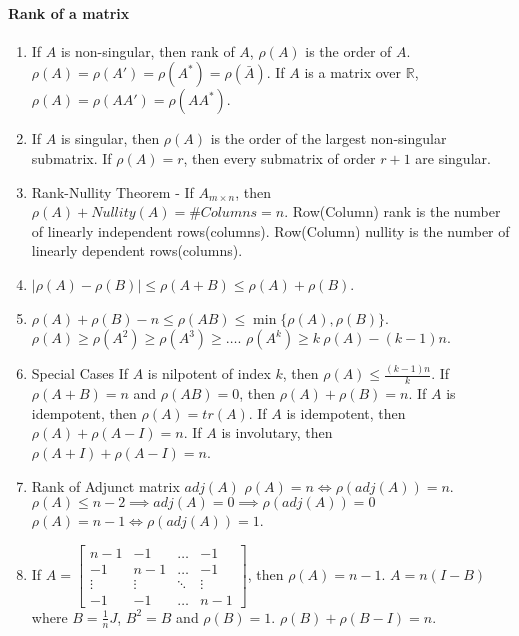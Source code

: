 \paragraph{Rank of a matrix}
\begin{enumerate}
	\item If $A$ is non-singular, then rank of $A$, $\rho(A)$ is the order of $A$.
		\subitem $\rho(A) = \rho(A') = \rho(A^\ast) = \rho(\bar{A})$.
		\subitem If $A$ is a matrix over $\mathbb{R}$, $\rho(A) = \rho(AA') = \rho(AA^\ast)$.
	\item If $A$ is singular, then $\rho(A)$ is the order of the largest non-singular submatrix.
		\subitem If $\rho(A) = r$, then every submatrix of order $r+1$ are singular.
	\item Rank-Nullity Theorem - If $A_{m \times n}$, then $\rho(A) + Nullity(A) = \# Columns = n$.
		\subitem Row(Column) rank is the number of linearly independent rows(columns).
		\subitem Row(Column) nullity is the number of linearly dependent rows(columns).
	\item $|\rho(A)-\rho(B)| \le \rho(A+B) \le \rho(A)+\rho(B)$.
	\item $\rho(A)+\rho(B)-n \le \rho(AB) \le \min\{ \rho(A),\rho(B) \}$.
		\subitem $\rho(A) \ge \rho(A^2) \ge \rho(A^3) \ge \dots$.
		\subitem $\rho(A^k) \ge k\ \rho(A) - (k-1)n$.
	\item Special Cases
		\subitem If $A$ is nilpotent of index $k$, then $\rho(A) \le \frac{(k-1)n}{k}$.
		\subitem If $\rho(A+B) = n$ and $\rho(AB) = 0$, then $\rho(A) + \rho(B) = n$.
		\subitem If $A$ is idempotent, then $\rho(A) = tr(A)$.
		\subitem If $A$ is idempotent, then $\rho(A) + \rho(A-I) = n$.
		\subitem If $A$ is involutary, then $\rho(A+I)+\rho(A-I) = n$.
	\item Rank of Adjunct matrix $adj(A)$
		\subitem $\rho(A) = n \iff \rho(adj(A)) = n$.
		\subitem $\rho(A) \le n-2 \implies adj(A) = 0 \implies \rho(adj(A)) = 0$
		\subitem $\rho(A) = n-1 \iff \rho(adj(A)) = 1$.
	\item If $A = \begin{bmatrix} n-1 & -1 & \dots & -1 \\ -1 & n-1 & \dots & -1 \\ \vdots & \vdots & \ddots & \vdots \\ -1 & - 1 & \dots & n-1 \end{bmatrix}$, then $\rho(A) = n-1$.
		\subitem $A = n(I - B)$ where $B = \frac{1}{n}J$, $B^2 = B$ and $\rho(B) = 1$. $\rho(B) + \rho(B-I) = n$.
\end{enumerate}

